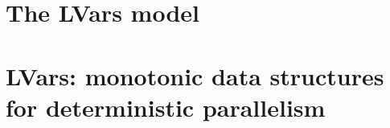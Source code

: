 \ifdefined\JOURNAL
\chapter{The LVars model}\label{ch:lvars} %
\fi

\ifdefined\DISSERTATION
\chapter{LVars: monotonic data structures for deterministic parallelism}\label{ch:lvars} %
\fi















